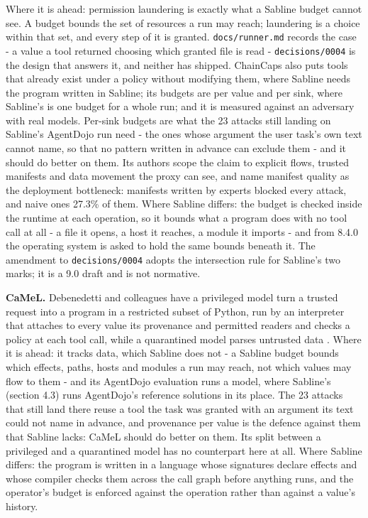 \documentclass[
]{article}
\begin{document}
Where it is ahead: permission laundering is exactly what a Sabline
budget cannot see. A budget bounds the set of resources a run may reach;
laundering is a choice within that set, and every step of it is granted.
\texttt{docs/runner.md} records the case - a value a tool returned
choosing which granted file is read - \texttt{decisions/0004} is the
design that answers it, and neither has shipped. ChainCaps also puts
tools that already exist under a policy without modifying them, where
Sabline needs the program written in Sabline; its budgets are per value
and per sink, where Sabline's is one budget for a whole run; and it is
measured against an adversary with real models. Per-sink budgets are
what the 23 attacks still landing on Sabline's AgentDojo run need - the
ones whose argument the user task's own text cannot name, so that no
pattern written in advance can exclude them - and it should do better on
them. Its authors scope the claim to explicit flows, trusted manifests
and data movement the proxy can see, and name manifest quality as the
deployment bottleneck: manifests written by experts blocked every
attack, and naive ones 27.3\% of them. Where Sabline differs: the budget
is checked inside the runtime at each operation, so it bounds what a
program does with no tool call at all - a file it opens, a host it
reaches, a module it imports - and from 8.4.0 the operating system is
asked to hold the same bounds beneath it. The amendment to
\texttt{decisions/0004} adopts the intersection rule for Sabline's two
marks; it is a 9.0 draft and is not normative.

\textbf{CaMeL.} Debenedetti and colleagues have a privileged model turn
a trusted request into a program in a restricted subset of Python, run
by an interpreter that attaches to every value its provenance and
permitted readers and checks a policy at each tool call, while a
quarantined model parses untrusted data \citep{debenedetti2025camel}.
Where it is ahead: it tracks data, which Sabline does not - a Sabline
budget bounds which effects, paths, hosts and modules a run may reach,
not which values may flow to them - and its AgentDojo evaluation runs a
model, where Sabline's (section 4.3) runs AgentDojo's reference
solutions in its place. The 23 attacks that still land there reuse a
tool the task was granted with an argument its text could not name in
advance, and provenance per value is the defence against them that
Sabline lacks: CaMeL should do better on them. Its split between a
privileged and a quarantined model has no counterpart here at all. Where
Sabline differs: the program is written in a language whose signatures
declare effects and whose compiler checks them across the call graph
before anything runs, and the operator's budget is enforced against the
operation rather than against a value's history.
\end{document}
